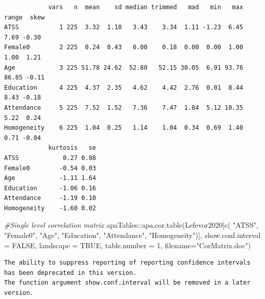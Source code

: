 \documentclass[
  11pt,
]{book}
\newenvironment{Shaded}{\begin{snugshade}}{\end{snugshade}}
\newcommand{\AttributeTok}[1]{\textcolor[rgb]{0.77,0.63,0.00}{#1}}
\newcommand{\CommentTok}[1]{\textcolor[rgb]{0.56,0.35,0.01}{\textit{#1}}}
\newcommand{\ConstantTok}[1]{\textcolor[rgb]{0.00,0.00,0.00}{#1}}
\newcommand{\DecValTok}[1]{\textcolor[rgb]{0.00,0.00,0.81}{#1}}
\newcommand{\FunctionTok}[1]{\textcolor[rgb]{0.00,0.00,0.00}{#1}}
\newcommand{\NormalTok}[1]{#1}
\newcommand{\SpecialCharTok}[1]{\textcolor[rgb]{0.00,0.00,0.00}{#1}}
\newcommand{\StringTok}[1]{\textcolor[rgb]{0.31,0.60,0.02}{#1}}
\begin{document}
\begin{verbatim}
            vars   n  mean    sd median trimmed   mad   min   max range  skew
ATSS           1 225  3.32  1.18   3.43    3.34  1.11 -1.23  6.45  7.69 -0.30
Female0        2 225  0.24  0.43   0.00    0.18  0.00  0.00  1.00  1.00  1.21
Age            3 225 51.78 24.62  52.80   52.15 30.05  6.91 93.76 86.85 -0.11
Education      4 225  4.37  2.35   4.62    4.42  2.76  0.01  8.44  8.43 -0.18
Attendance     5 225  7.52  1.52   7.36    7.47  1.84  5.12 10.35  5.22  0.24
Homogeneity    6 225  1.04  0.25   1.14    1.04  0.34  0.69  1.40  0.71 -0.04
            kurtosis   se
ATSS            0.27 0.08
Female0        -0.54 0.03
Age            -1.11 1.64
Education      -1.06 0.16
Attendance     -1.19 0.10
Homogeneity    -1.60 0.02
\end{verbatim}

\begin{Shaded}
\begin{Highlighting}[]
\CommentTok{\#Single level correlation matrix}
\NormalTok{apaTables}\SpecialCharTok{::}\FunctionTok{apa.cor.table}\NormalTok{(Lefevor2020[}\FunctionTok{c}\NormalTok{(}
\StringTok{"ATSS"}\NormalTok{, }\StringTok{"Female0"}\NormalTok{, }\StringTok{"Age"}\NormalTok{, }\StringTok{"Education"}\NormalTok{, }\StringTok{"Attendance"}\NormalTok{, }\StringTok{"Homogeneity"}\NormalTok{)], }\AttributeTok{show.conf.interval =} \ConstantTok{FALSE}\NormalTok{, }\AttributeTok{landscape =} \ConstantTok{TRUE}\NormalTok{, }\AttributeTok{table.number =} \DecValTok{1}\NormalTok{, }\AttributeTok{filename=}\StringTok{"CorMatrix.doc"}\NormalTok{)}
\end{Highlighting}
\end{Shaded}

\begin{verbatim}
The ability to suppress reporting of reporting confidence intervals has been deprecated in this version.
The function argument show.conf.interval will be removed in a later version.
\end{verbatim}
\end{document}
